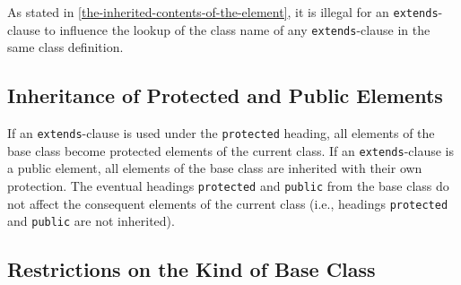 \begin{nonnormative}
As stated in \cref{the-inherited-contents-of-the-element}, it is illegal for an \lstinline!extends!-clause to influence the lookup of the class name of any \lstinline!extends!-clause in the same class definition.
\end{nonnormative}

\subsection{Inheritance of Protected and Public Elements}\label{inheritance-of-protected-and-public-elements}

If an \lstinline!extends!-clause is used under the \lstinline!protected! heading, all elements of the base class become protected elements of the current class.
If an \lstinline!extends!-clause is a public element, all elements of the base class are inherited with their own protection.
The eventual headings \lstinline!protected! and \lstinline!public! from the base class do not affect the consequent elements of the current class (i.e., headings \lstinline!protected! and \lstinline!public! are not inherited).

\subsection{Restrictions on the Kind of Base Class}\label{restrictions-on-the-kind-of-base-class}

